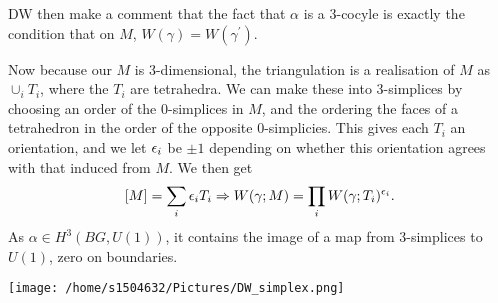 \documentclass{article}
\begin{document}
\begin{remark}
	DW then make a comment that the fact that $\alpha$ is a 3-cocyle is exactly the condition that on $M$, $W(\gamma) = W(\gamma^\prime)$. 
\end{remark}

Now because our $M$ is 3-dimensional, the triangulation is a realisation of $M$ as $\cup_i T_i$, where the $T_i$ are tetrahedra. We can make these into 3-simplices by choosing an order of the 0-simplices in $M$, and the ordering the faces of a tetrahedron in the order of the opposite 0-simplicies. This gives each $T_i$ an orientation, and we let $\epsilon_i$ be $\pm1$ depending on whether this orientation agrees with that induced from $M$. We then get 
\[
[M] = \sum_i \epsilon_i T_i \Rightarrow W(\gamma; M) = \prod_i W(\gamma; T_i)^{\epsilon_i}. 
\]
As $\alpha \in H^3(BG, U(1))$, it contains the image of a map from 3-simplices to $U(1)$, zero on boundaries. 

\texttt{[image: /home/s1504632/Pictures/DW\_simplex.png]}
\end{document}
